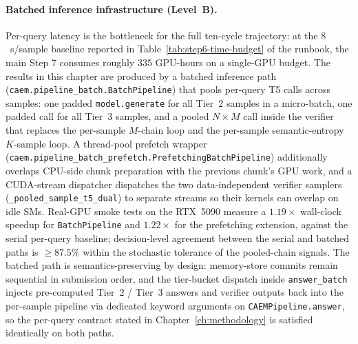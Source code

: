 \paragraph{Batched inference infrastructure (Level~B).}
Per-query latency is the bottleneck for the full ten-cycle
trajectory: at the $8$~s/sample baseline reported in
Table~\ref{tab:step6-time-budget} of the runbook, the main Step 7
consumes roughly $335$ GPU-hours on a single-GPU budget. The
results in this chapter are produced by a batched inference path
(\texttt{caem.pipeline\_batch.BatchPipeline}) that pools per-query
T5 calls across samples: one padded \texttt{model.generate} for all
Tier~2 samples in a micro-batch, one padded call for all Tier~3
samples, and a pooled $N{\times}M$ call inside the verifier that
replaces the per-sample $M$-chain loop and the per-sample
semantic-entropy $K$-sample loop. A thread-pool prefetch wrapper
(\texttt{caem.pipeline\_batch\_prefetch.PrefetchingBatchPipeline})
additionally overlaps CPU-side chunk preparation with the
previous chunk's GPU work, and a CUDA-stream dispatcher dispatches
the two data-independent verifier samplers
(\texttt{\_pooled\_sample\_t5\_dual}) to separate streams so their
kernels can overlap on idle SMs. Real-GPU smoke tests on the
RTX~5090 measure a $1.19 \times$ wall-clock speedup for
\texttt{BatchPipeline} and $1.22 \times$ for the prefetching
extension, against the serial per-query baseline; decision-level
agreement between the serial and batched paths is $\geq 87.5\%$
within the stochastic tolerance of the pooled-chain signals. The
batched path is semantics-preserving by design: memory-store
commits remain sequential in submission order, and the tier-bucket
dispatch inside \texttt{answer\_batch} injects pre-computed Tier~2 /
Tier~3 answers and verifier outputs back into the per-sample
pipeline via dedicated keyword arguments on
\texttt{CAEMPipeline.answer}, so the per-query contract stated in
Chapter~\ref{ch:methodology} is satisfied identically on both
paths.

